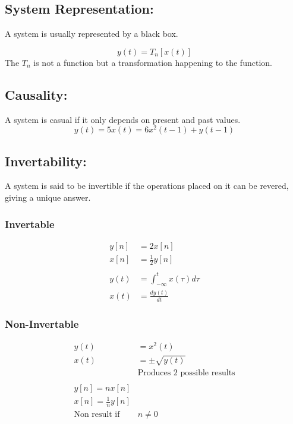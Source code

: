 \documentclass[a5paper]{article}
\begin{document}
	\subsection{System Representation:}
	A system is usually represented by a black box.
	\begin{center}
	\end{center}
	$$y(t)=T_{n}[x(t)]$$
	The $T_{n}$ is not a function but a transformation happening to the function.
	\subsection{Causality:}
	A system is casual if it only depends on present and past values.
	$$y(t)=5x(t)=6x^{2}(t-1)+y(t-1)$$
	\subsection{Invertability:}
	A system is said to be invertible if the operations placed on it can be revered, giving a unique answer.
	\subsubsection{Invertable}
	\begin{align*}
		y[n]&=2x[n]\\
		x[n]&=\frac{1}{2}y[n]\\\\
		y(t)&=\int^{t}_{-\infty}x(\tau)d\tau\\
		x(t)&=\frac{dy(t)}{dt}
	\end{align*}
	\subsubsection{Non-Invertable}
	\begin{align*}
		y(t)&=x^{2}(t)\\
		x(t)&=\pm\sqrt{y(t)}\\
		&\text{Produces 2 possible results}\\\\
		y[n]=nx[n]\\
		x[n]=\frac{1}{n}y[n]\\
		\text{Non result if }&n\neq0
	\end{align*}
\end{document}
